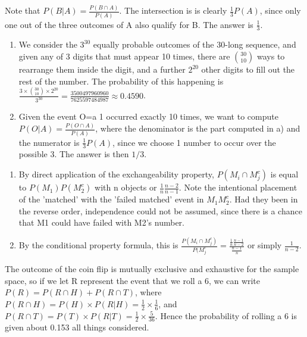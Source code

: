 \documentclass{article}
\begin{document}
\begin{prob}
	Note that $P(B|A)=\frac{P(B \cap A)}{P(A)}$. The intersection is is clearly $\frac{1}{3}P(A)$, since only one out of the three outcomes of A also qualify for B. The answer is $\frac{1}{3}$.
\end{prob}

\begin{prob}
	\begin{enumerate}
		\item We consider the $3^{30}$ equally probable outcomes of the 30-long sequence, and given any of 3 digits that must appear 10 times, there are ${30 \choose 10}$ ways to rearrange them inside the digit, and a further $2^{20}$ other digits to fill out the rest of the number.
		The probability of this happening is $\frac{3\times{30 \choose 10}\times2^{20}}{3^{30}}=\frac{3500497960960}{7625597484987}\approx 0.4590$.

	\item Given the event O=a 1 occurred exactly 10 times, we want to compute $P(O|A)=\frac{P(O \cap A)}{P(A)}$, where the denominator is the part computed in a) and the numerator is $\frac{1}{3}P(A)$, since we choose 1 number to occur over the possible 3.
		The answer is then $1/3$.
	\end{enumerate}
\end{prob}

\begin{prob}
	\begin{enumerate}
		\item By direct application of the exchangeability property, $P(M_i \cap M_j^c)$ is equal to $P(M_1)P(M_2^c)$ with n objects or $\frac{1}{n}\frac{n-2}{n-1}$. Note the intentional placement of the 'matched' with the 'failed matched' event in $M_1M_2^c$. Had they been in the reverse order, independence could not be assumed, since there is a chance that M1 could have failed with M2's number.

		\item By the conditional property formula, this is $\frac{P(M_i \cap M_j^c)}{P(M_j^c}=\frac{\frac{1}{n}\frac{n-1}{n-2}}{\frac{n-1}{n}}$ or simply $\frac{1}{n-2}$.
	\end{enumerate}
\end{prob}

\begin{prob}
	The outcome of the coin flip is mutually exclusive and exhaustive for the sample space, so if we let R represent the event that we roll a 6,
	we can write $P(R)=P(R \cap H)+P(R \cap T)$, where $P(R \cap H)=P(H)\times P(R|H)=\frac{1}{2}\times\frac{1}{6}$, and $P(R \cap T)=P(T)\times P(R|T)=\frac{1}{2}\times\frac{5}{36}$.
	Hence the probability of rolling a 6 is given about 0.153 all things considered.
\end{prob}
\end{document}
